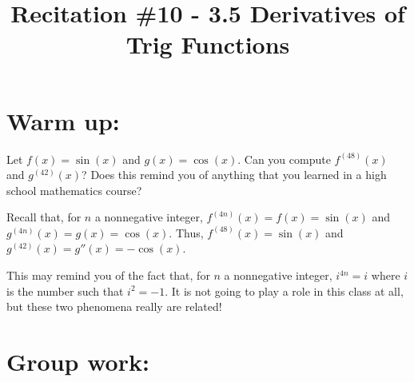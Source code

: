 \documentclass[handout,nooutcomes]{ximera}
\title{Recitation \#10 - 3.5 Derivatives of Trig Functions}
\begin{document}
\begin{abstract}		\end{abstract}
\maketitle

\section*{Warm up:} 
Let $f(x) = \sin(x)$ and $g(x) = \cos(x)$.  Can you compute $f^{(48)}(x)$ and $g^{(42)}(x)$?  Does this remind you of anything that you learned in a high school mathematics course?
	\begin{freeResponse}
	Recall that, for $n$ a nonnegative integer, $f^{(4n)}(x) = f(x) = \sin(x)$ and $g^{(4n)}(x) = g(x) = \cos(x)$.  Thus, $f^{(48)}(x) = \sin(x)$ and $g^{(42)}(x) = g''(x) = - \cos(x)$.  

	This may remind you of the fact that, for $n$ a nonnegative integer, $i^{4n} = i$ where $i$ is the number such that $i^2 = -1$.  It is not going to play a role in this class at all, but these two phenomena really are related!
	\end{freeResponse}	
	
	
	
	
	

\section*{Group work:}
\end{document}
